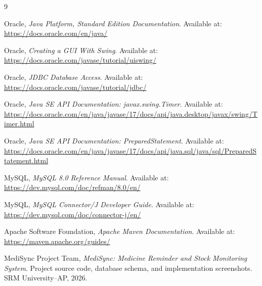 \documentclass[12pt,a4paper,oneside]{report}
\begin{document}
\begin{thebibliography}{9}

Oracle,
\textit{Java Platform, Standard Edition Documentation}.
Available at: \url{https://docs.oracle.com/en/java/}

Oracle,
\textit{Creating a GUI With Swing}.
Available at: \url{https://docs.oracle.com/javase/tutorial/uiswing/}

Oracle,
\textit{JDBC Database Access}.
Available at: \url{https://docs.oracle.com/javase/tutorial/jdbc/}

Oracle,
\textit{Java SE API Documentation: javax.swing.Timer}.
Available at: \url{https://docs.oracle.com/en/java/javase/17/docs/api/java.desktop/javax/swing/Timer.html}

Oracle,
\textit{Java SE API Documentation: PreparedStatement}.
Available at: \url{https://docs.oracle.com/en/java/javase/17/docs/api/java.sql/java/sql/PreparedStatement.html}

MySQL,
\textit{MySQL 8.0 Reference Manual}.
Available at: \url{https://dev.mysql.com/doc/refman/8.0/en/}

MySQL,
\textit{MySQL Connector/J Developer Guide}.
Available at: \url{https://dev.mysql.com/doc/connector-j/en/}

Apache Software Foundation,
\textit{Apache Maven Documentation}.
Available at: \url{https://maven.apache.org/guides/}

MediSync Project Team,
\textit{MediSync: Medicine Reminder and Stock Monitoring System}.
Project source code, database schema, and implementation screenshots.
SRM University--AP, 2026.

\end{thebibliography}
\end{document}
